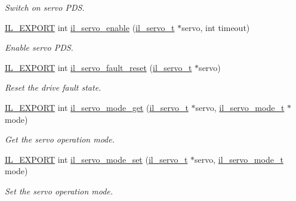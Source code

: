 \begin{DoxyCompactItemize}
\begin{DoxyCompactList}\small\item\em Switch on servo P\+DS. \end{DoxyCompactList}\item 
\hyperlink{common_8h_a6bb629d26c52bfe10519ba3176853f47}{I\+L\+\_\+\+E\+X\+P\+O\+RT} int \hyperlink{group__IL__SERVO_gaee57b72c5f6d4756a6a914edbf0db0d9}{il\+\_\+servo\+\_\+enable} (\hyperlink{group__IL__SERVO_ga3369ddfcc33492fe3a28f96cf455b13e}{il\+\_\+servo\+\_\+t} $\ast$servo, int timeout)
\begin{DoxyCompactList}\small\item\em Enable servo P\+DS. \end{DoxyCompactList}\item 
\hyperlink{common_8h_a6bb629d26c52bfe10519ba3176853f47}{I\+L\+\_\+\+E\+X\+P\+O\+RT} int \hyperlink{group__IL__SERVO_ga75fbdd6046af1825619d2710580911e2}{il\+\_\+servo\+\_\+fault\+\_\+reset} (\hyperlink{group__IL__SERVO_ga3369ddfcc33492fe3a28f96cf455b13e}{il\+\_\+servo\+\_\+t} $\ast$servo)
\begin{DoxyCompactList}\small\item\em Reset the drive fault state. \end{DoxyCompactList}\item 
\hyperlink{common_8h_a6bb629d26c52bfe10519ba3176853f47}{I\+L\+\_\+\+E\+X\+P\+O\+RT} int \hyperlink{group__IL__SERVO_ga7f545d6dd93e52f55688bb03ee263004}{il\+\_\+servo\+\_\+mode\+\_\+get} (\hyperlink{group__IL__SERVO_ga3369ddfcc33492fe3a28f96cf455b13e}{il\+\_\+servo\+\_\+t} $\ast$servo, \hyperlink{group__IL__SERVO_ga6b3323798a8f235c225cc1d0cd27840a}{il\+\_\+servo\+\_\+mode\+\_\+t} $\ast$mode)
\begin{DoxyCompactList}\small\item\em Get the servo operation mode. \end{DoxyCompactList}\item 
\hyperlink{common_8h_a6bb629d26c52bfe10519ba3176853f47}{I\+L\+\_\+\+E\+X\+P\+O\+RT} int \hyperlink{group__IL__SERVO_ga9ef9a84e8b6aa1ee23d301dbd93b8b2f}{il\+\_\+servo\+\_\+mode\+\_\+set} (\hyperlink{group__IL__SERVO_ga3369ddfcc33492fe3a28f96cf455b13e}{il\+\_\+servo\+\_\+t} $\ast$servo, \hyperlink{group__IL__SERVO_ga6b3323798a8f235c225cc1d0cd27840a}{il\+\_\+servo\+\_\+mode\+\_\+t} mode)
\begin{DoxyCompactList}\small\item\em Set the servo operation mode. \end{DoxyCompactList}\item 

\end{DoxyCompactItemize}
